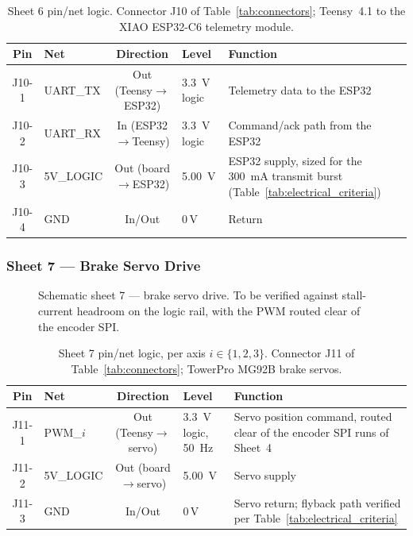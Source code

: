 \begin{table}[htbp]
\centering
\caption[Sheet 6 pin/net logic]{Sheet 6 pin/net logic. Connector J10 of Table~\ref{tab:connectors};
Teensy~4.1 to the XIAO ESP32-C6 telemetry module.}
\label{tab:pins_telemetry}
\small
\setlength{\tabcolsep}{4pt}
\begin{tabular}{c L{2.6cm} c L{2.4cm} L{5.4cm}}
\toprule
Pin & Net & Direction & Level & Function \\
\midrule
J10-1 & UART\_TX & Out (Teensy$\to$ESP32) & \qty{3.3}{\volt} logic & Telemetry data to the ESP32 \\
J10-2 & UART\_RX & In (ESP32$\to$Teensy) & \qty{3.3}{\volt} logic & Command/ack path from the ESP32 \\
J10-3 & 5V\_LOGIC & Out (board$\to$ESP32) & \qty{5.00}{\volt} & ESP32 supply, sized for the \qty{300}{\milli\ampere} transmit burst (Table~\ref{tab:electrical_criteria}) \\
J10-4 & GND & In/Out & 0\,V & Return \\
\bottomrule
\end{tabular}
\end{table}

\subsubsection{Sheet 7 --- Brake Servo Drive}
\begin{figure}[htbp]
\centering
{}
\caption[Schematic sheet 7: brake servo drive]{Schematic sheet 7 --- brake servo drive. To be verified against
stall-current headroom on the logic rail, with the PWM routed clear of the
encoder SPI.}
\label{fig:sch_servo}
\end{figure}

\begin{table}[htbp]
\centering
\caption[Sheet 7 pin/net logic]{Sheet 7 pin/net logic, per axis $i\in\{1,2,3\}$. Connector J11 of
Table~\ref{tab:connectors}; TowerPro MG92B brake servos.}
\label{tab:pins_servo}
\small
\setlength{\tabcolsep}{4pt}
\begin{tabular}{c L{2.6cm} c L{2.4cm} L{5.4cm}}
\toprule
Pin & Net & Direction & Level & Function \\
\midrule
J11-1 & PWM\_$i$ & Out (Teensy$\to$servo) & \qty{3.3}{\volt} logic, \qty{50}{\hertz} & Servo position command, routed clear of the encoder SPI runs of Sheet~4 \\
J11-2 & 5V\_LOGIC & Out (board$\to$servo) & \qty{5.00}{\volt} & Servo supply \\
J11-3 & GND & In/Out & 0\,V & Servo return; flyback path verified per Table~\ref{tab:electrical_criteria} \\
\bottomrule
\end{tabular}
\end{table}


